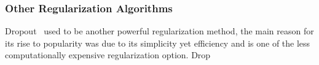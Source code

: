 \subsubsection{Other Regularization Algorithms}

Dropout~\cite{JMLR:v15:srivastava14a} used to be another powerful regularization method, the main reason for its rise to popularity was due to its simplicity yet efficiency and is one of the less computationally expensive regularization option. Drop